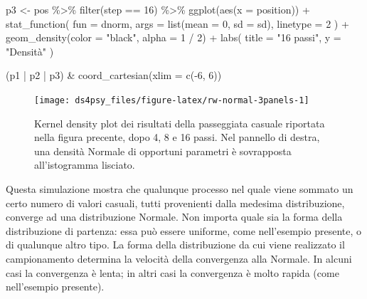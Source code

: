 \documentclass[
  11pt,
]{krantz}
\makeatletter
\newenvironment{Shaded}{\begin{snugshade}}{\end{snugshade}}
\newcommand{\AttributeTok}[1]{\textcolor[rgb]{0.61,0.61,0.61}{#1}}
\newcommand{\DecValTok}[1]{\textcolor[rgb]{0.06,0.06,0.06}{#1}}
\newcommand{\FunctionTok}[1]{\textcolor[rgb]{0,0,0}{#1}}
\newcommand{\NormalTok}[1]{#1}
\newcommand{\OtherTok}[1]{\textcolor[rgb]{0.37,0.37,0.37}{#1}}
\newcommand{\SpecialCharTok}[1]{\textcolor[rgb]{0,0,0}{#1}}
\newcommand{\StringTok}[1]{\textcolor[rgb]{0.5,0.5,0.5}{#1}}
\newenvironment{kframe}{%
\medskip{}
\setlength{\fboxsep}{.8em}
 \def\at@end@of@kframe{}%
 \ifinner\ifhmode%
  \def\at@end@of@kframe{\end{minipage}}%
  \begin{minipage}{\columnwidth}%
 \fi\fi%
 \def\FrameCommand##1{\hskip\@totalleftmargin \hskip-\fboxsep
 \colorbox{shadecolor}{##1}\hskip-\fboxsep
     \hskip-\linewidth \hskip-\@totalleftmargin \hskip\columnwidth}%
 \MakeFramed {\advance\hsize-\width
   \@totalleftmargin\z@ \linewidth\hsize
   \@setminipage}}%
 {\par\unskip\endMakeFramed%
 \at@end@of@kframe}
\renewenvironment{Shaded}{\begin{kframe}}{\end{kframe}}
\theoremstyle{definition}
\theoremstyle{definition}
\theoremstyle{definition}
\theoremstyle{definition}
\theoremstyle{remark}
\makeatother
\begin{document}
\begin{Shaded}
\begin{Highlighting}[]
\NormalTok{p3 }\OtherTok{\textless{}{-}}
\NormalTok{  pos }\SpecialCharTok{\%\textgreater{}\%}
  \FunctionTok{filter}\NormalTok{(step }\SpecialCharTok{==} \DecValTok{16}\NormalTok{) }\SpecialCharTok{\%\textgreater{}\%}
  \FunctionTok{ggplot}\NormalTok{(}\FunctionTok{aes}\NormalTok{(}\AttributeTok{x =}\NormalTok{ position)) }\SpecialCharTok{+}
  \FunctionTok{stat\_function}\NormalTok{(}
    \AttributeTok{fun =}\NormalTok{ dnorm,}
    \AttributeTok{args =} \FunctionTok{list}\NormalTok{(}\AttributeTok{mean =} \DecValTok{0}\NormalTok{, }\AttributeTok{sd =}\NormalTok{ sd),}
    \AttributeTok{linetype =} \DecValTok{2}
\NormalTok{  ) }\SpecialCharTok{+}
  \FunctionTok{geom\_density}\NormalTok{(}\AttributeTok{color =} \StringTok{"black"}\NormalTok{, }\AttributeTok{alpha =} \DecValTok{1} \SpecialCharTok{/} \DecValTok{2}\NormalTok{) }\SpecialCharTok{+}
  \FunctionTok{labs}\NormalTok{(}
    \AttributeTok{title =} \StringTok{"16 passi"}\NormalTok{,}
    \AttributeTok{y =} \StringTok{"Densità"}
\NormalTok{  )}

\NormalTok{(p1 }\SpecialCharTok{|}\NormalTok{ p2 }\SpecialCharTok{|}\NormalTok{ p3) }\SpecialCharTok{\&} \FunctionTok{coord\_cartesian}\NormalTok{(}\AttributeTok{xlim =} \FunctionTok{c}\NormalTok{(}\SpecialCharTok{{-}}\DecValTok{6}\NormalTok{, }\DecValTok{6}\NormalTok{))}
\end{Highlighting}
\end{Shaded}

\begin{figure}[h]

{\centering \texttt{[image: ds4psy\_files/figure-latex/rw-normal-3panels-1]} 

}

\caption{Kernel density plot dei risultati della passeggiata casuale riportata nella figura precente, dopo 4, 8 e 16 passi. Nel pannello di destra, una densità Normale di opportuni parametri è sovrapposta all'istogramma lisciato.}\label{fig:rw-normal-3panels}
\end{figure}

Questa simulazione mostra che qualunque processo nel quale viene sommato un certo numero di valori casuali, tutti provenienti dalla medesima distribuzione, converge ad una distribuzione Normale. Non importa quale sia la forma della distribuzione di partenza: essa può essere uniforme, come nell'esempio presente, o di qualunque altro tipo. La forma della distribuzione da cui viene realizzato il campionamento determina la velocità della convergenza alla Normale. In alcuni casi la convergenza è lenta; in altri casi la convergenza è molto rapida (come nell'esempio presente).
\end{document}
